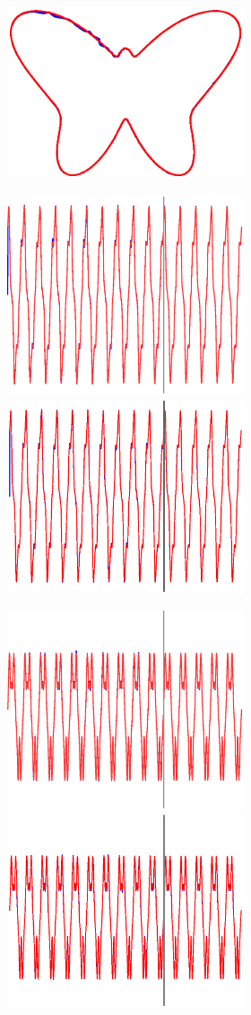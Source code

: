 \begin{figure}
\begin{subfigure}{\textwidth}
\begin{subfigure}{\textwidth}
        \hspace{3em}
        \includegraphics[trim=1.5cm 2cm 1.5cm 2cm, clip=true,height=.1\textheight]{Figures/Fig_T1/Python/FORCE_T1_Trajectory_noaxis}

        \end{subfigure}
         
         
        \textbf{}\begin{subfigure}{\textwidth}
        \centering
        
        \includegraphics[height=0.08\linewidth,width=.45\linewidth]{Figures/Fig_T1/MATLAB/FORCE_T1_CoordinateX}
        \includegraphics[trim=2cm 1cm 2cm 1cm, clip=true,height=0.08\linewidth,width=.45\linewidth]{Figures/Fig_T1/Python/FORCE_T1_CoordinateX}
        
        \end{subfigure}
        
        
        \textbf{}\begin{subfigure}{\textwidth}
        \centering
        
        \includegraphics[height=0.08\linewidth,width=.45\linewidth]{Figures/Fig_T1/MATLAB/FORCE_T1_CoordinateY}
        \includegraphics[trim=2cm 1cm 2cm 1cm, clip=true,height=0.08\linewidth,width=.45\linewidth]{Figures/Fig_T1/Python/FORCE_T1_CoordinateY}
        

\end{subfigure}
\end{subfigure}
\end{figure}
